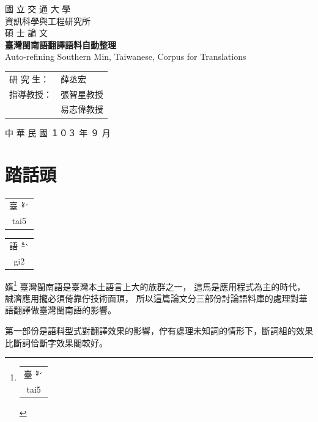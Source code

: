 \documentclass[final,oneside,onecolumn,12pt,a4paper]{book}%
\makeatletter
\newcommand{\rubybot}[2]{
  \@tempdimc \f@size\p@
  \begin{tabular}[t]{@{}c@{}}
    #1\\[-3em]
    \fontsize{.8\@tempdimc}{.8\@tempdimc}\selectfont%
    \setlength{\normalbaselineskip}{0pt}#2 
  \end{tabular}%
}
\makeatother
\begin{document}
\begin{titlepage}

\begin{center}

   

\textsc{\Huge 國 立 交 通 大 學} %
\\[2em]
\textsc{\LARGE 資訊科學與工程研究所} %
\\[2em]
\textsc{\LARGE 碩 士 論 文} %
\\[3em]

{\huge \bfseries 臺灣閩南語翻譯語料自動整理 } %
\\[1em]
{\LARGE Auto-refining Southern Min, Taiwanese, Corpus for Translations}
\\[3em]

\begin{table}[H]
\centering
\Large
\begin{tabular}{ll}
研 究 生： & 薛丞宏\\ %
指導教授： & 張智星教授\\ %
 & 易志偉教授\\ %
\end{tabular}
\end{table}

\vfill

{\large 中 華 民 國  １０３  年  ９  月}

\end{center}

\end{titlepage}


\frontmatter
\chapter{踏話頭}

\rubybot{臺 \includegraphics[height=1em]{音/⿳⿳ㄉㄞˊ}}{tai5}
\rubybot{語 \includegraphics[height=1em]{音/⿳⿳ㆣㄧˋ}}{gi2}
媠\footnote{\rubybot{臺 \includegraphics[height=1em]{音/⿳⿳ㄉㄞˊ}}{tai5}}
臺灣閩南語是臺灣本土語言上大的族群之一，
這馬是應用程式為主的時代，誠濟應用攏必須倚靠佇技術面頂，
所以這篇論文分三部份討論語料庫的處理對華語翻譯做臺灣閩南語的影響。

第一部份是語料型式對翻譯效果的影響，佇有處理未知詞的情形下，斷詞組的效果比斷詞佮斷字效果閣較好。
\end{document}

